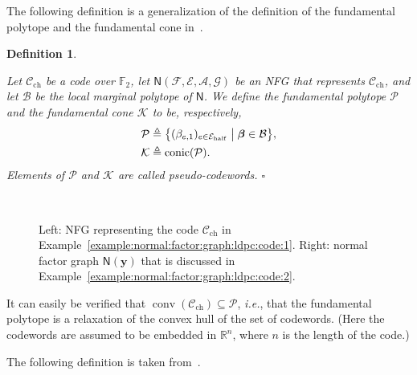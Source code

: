 \documentclass[journal, twocolumn]{IEEEtran}
\renewcommand{\mathbf}[1]{{\bm{#1}}}
\newcommand{\ie}{\emph{i.e.}}
\newcommand{\R}{\mathbb{R}}
\newcommand{\vect}[1]{\mathbf{#1}}
\newcommand{\code}[1]{\mathcal{#1}}
\newcommand{\set}[1]{\mathcal{#1}}
\newcommand{\graph}[1]{\mathsf{#1}}
\newcommand{\GF}[1]{\mathbb{F}_{#1}}
\newcommand{\defeq}{\triangleq}
\newcommand{\codeCchannel}{\code{C}_{\mathrm{ch}}}
\newcommand{\bel}{\beta}
\newcommand{\vbel}{\boldsymbol{\bel}}
\newcommand{\setA}{\set{A}}
\newcommand{\setE}{\set{E}}
\newcommand{\setEhalf}{\set{E}_{\mathrm{half}}}
\newcommand{\setF}{\set{F}}
\newcommand{\setG}{\set{G}}
\newcommand{\vy}{\vect{y}}
\newcommand{\fp}[1]{\mathcal{#1}}
\newcommand{\fc}[1]{\mathcal{#1}}
\newcommand{\lmpB}{\mathcal{B}}
\newcommand{\graphN}{\graph{N}}
\newcommand{\convhull}{\operatorname{conv}}
\newcommand{\conichull}{\operatorname{conic}}
\newcommand{\?}{\mathrm{?}}
\newcommand{\qedwhite}{\hspace*{\fill}%
  $\square$\smallskip}
\newcommand{\defend}{\qedwhite}
\newtheorem{Definition}[Lemma]{Definition}
\begin{document}
The following definition is a generalization of the definition of the
fundamental polytope and the fundamental cone in~\cite{Koetter:Vontobel:03:1,
  Vontobel:Koetter:05:1:subm}.


\begin{Definition}
  \label{def:fundamental:polytope:1}

  Let $\codeCchannel$ be a code over $\GF{2}$, let $\graphN(\setF,\setE, \setA,
  \setG)$ be an NFG that represents $\codeCchannel$, and let $\lmpB$
  be the local marginal polytope of $\graphN$. We define the fundamental
  polytope $\fp{P}$ and the fundamental cone $\fc{K}$ to be, respectively,
  \begin{align*}
    \fp{P}
      &\defeq
         \big\{
           (\bel_{e,1})_{e \in \setEhalf}
         \bigm|
           \vbel \in \lmpB
         \big\}, \\
    \fc{K}
      &\defeq
         \conichull(\fp{P}).
  \end{align*}
  Elements of $\fp{P}$ and $\fc{K}$ are called pseudo-codewords.
  \defend
\end{Definition}


\begin{figure}
  \hskip0.1cm
  \begin{minipage}[c]{0.40\linewidth}
  \end{minipage}
  \hskip1cm
  \begin{minipage}[c]{0.40\linewidth}
    \mbox{} \\[0.2cm]
  \end{minipage}
  \caption{Left: NFG representing the code $\codeCchannel$ in
    Example~\ref{example:normal:factor:graph:ldpc:code:1}. Right: normal
    factor graph $\graphN(\vy)$ that is discussed in
    Example~\ref{example:normal:factor:graph:ldpc:code:2}.}
  \label{fig:normal:factor:graph:ldpc:code:1}
\end{figure}


It can easily be verified that $\convhull(\codeCchannel) \subseteq \fp{P}$,
\ie, that the fundamental polytope is a relaxation of the convex hull of the
set of codewords. (Here the codewords are assumed to be embedded in $\R^n$,
where $n$ is the length of the code.)





The following definition is taken from~\cite{Vontobel:10:2}.
\end{document}
